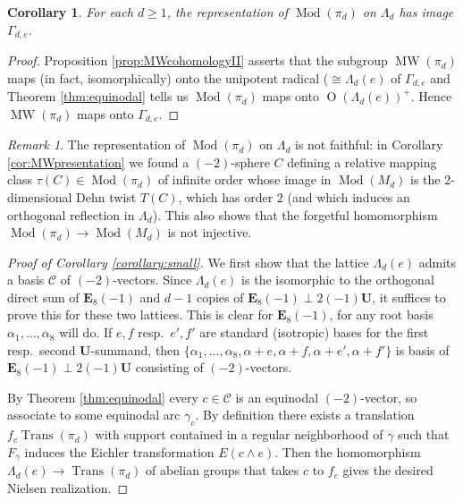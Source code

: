 \documentclass[10pt,letterpaper]{amsart}
\numberwithin{equation}{section}
\def\Eb{\mathbf {E}}
\def\Ub{\mathbf{U}}
\def\G{\Gamma}
\def\g{\gamma}
\def\Cscr{{\mathscr C}}
\newcommand\Mod{\operatorname{Mod}}
\newcommand\MW{\operatorname{MW}}
\newcommand\Orth{\operatorname{O}}
\newcommand\Trans{\operatorname{Trans}}
\newtheorem{corollary}[theorem]{Corollary}
\theoremstyle{remark}
\newtheorem{remark}[theorem]{Remark}
\begin{document}
\begin{corollary}\label{cor:repisonto}
For each $d\geq 1$, the representation of  $\Mod(\pi_d)$ on $\Lambda_d$ has image $\G_{d,e}$. 
\end{corollary}
\begin{proof}
Proposition \ref{prop:MWcohomologyII} asserts that the subgroup $\MW(\pi_d)$ maps (in fact, isomorphically) onto the unipotent radical ($\cong \Lambda_d(e)$ of $\G_{d,e}$ and  
Theorem \ref{thm:equinodal} tells us  $\Mod(\pi_d)$  maps onto $\Orth(\Lambda_d(e))^+$. Hence  $\MW(\pi_d)$ maps onto $\G_{d,e}$.
\end{proof}


\begin{remark}\label{rem:repnonfaithful}
The representation of $\Mod(\pi_d)$ on $\Lambda_d$ is not faithful:
in Corollary  \ref{cor:MWpresentation} we found a  $(-2)$-sphere $C$  defining  a relative mapping class $\tau(C)\in \Mod(\pi_d)$ of infinite order whose image in $\Mod (M_d)$ is the 2-dimensional Dehn twist $T(C)$, which  has  order $2$ (and which induces an orthogonal reflection in $\Lambda_d$).  This also shows that the forgetful  homomorphism $\Mod(\pi_d)\to \Mod (M_d)$ is not injective.  
\end{remark}



\begin{proof}[Proof of  Corollary \ref{corollary:small}]
\label{proof:Nielsen1}
We first show that the lattice $\Lambda_d(e)$ admits a basis $\Cscr$ of $(-2)$-vectors. Since $\Lambda_d(e)$ is the isomorphic to the orthogonal direct sum of $\Eb_8(-1)$ and $d-1$ copies of $\Eb_8(-1)\perp 2(-1)\Ub$, it suffices to prove this for these two lattices. This is clear for  
$\Eb_8(-1)$, for any root basis $\alpha_1, \dots, \alpha_8$ will do. If $e,f$ resp.\  $e',f'$ are standard (isotropic) bases for the first resp.\ second $\Ub$-summand, then $\{\alpha_1, \dots, \alpha_8, \alpha+e, \alpha+f, \alpha+e', \alpha+f'\}$ is basis of $\Eb_8(-1)\perp 2(-1)\Ub$ consisting of $(-2)$-vectors.

By Theorem \ref{thm:equinodal}  every $c\in \Cscr$ is an equinodal $(-2)$-vector, so associate  to some equinodal arc 
$\g_c$. By definition there exists a translation   $f_c\Trans(\pi_d)$ with  support contained in a regular neighborhood of $\g$ such that $F_\g$ induces the Eichler transformation $E(c\wedge e)$. Then the homomorphism $\Lambda_d(e)\to \Trans(\pi_d)$ of abelian groups that takes $c$ to  $f_c$ gives the desired  Nielsen realization.
\end{proof}
\end{document}
